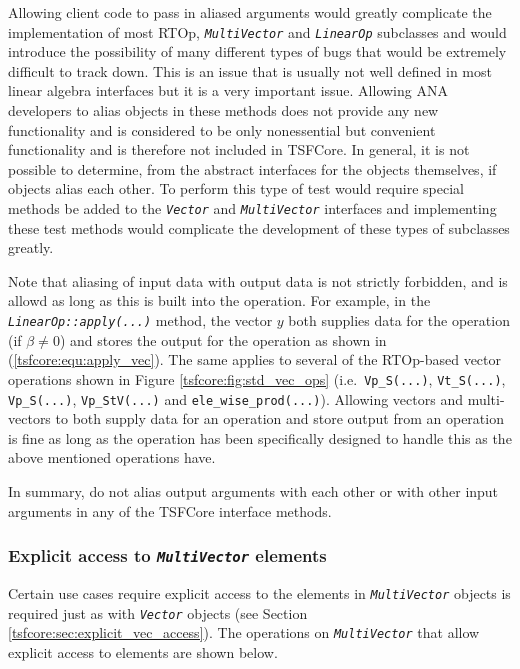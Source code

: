 {}\noindent{}Allowing client code to pass in aliased arguments would
greatly complicate the implementation of most RTOp,
{}\texttt{\textit{Multi\-Vector}} and {}\texttt{\textit{LinearOp}}
subclasses and would introduce the possibility of many different types
of bugs that would be extremely difficult to track down.  This is an
issue that is usually not well defined in most linear algebra
interfaces but it is a very important issue.  Allowing ANA developers
to alias objects in these methods does not provide any new
functionality and is considered to be only nonessential but convenient
functionality and is therefore not included in TSFCore.  In general,
it is not possible to determine, from the abstract interfaces for the
objects themselves, if objects alias each other.  To perform this type
of test would require special methods be added to the
{}\texttt{\textit{Vector}} and {}\texttt{\textit{Multi\-Vector}}
interfaces and implementing these test methods would complicate the
development of these types of subclasses greatly.

Note that aliasing of input data with output data is not strictly
forbidden, and is allowd as long as this is built into the operation.
For example, in the {}\texttt{\textit{LinearOp\-::apply(\-...)}}
method, the vector $y$ both supplies data for the operation (if $\beta
\ne 0$) and stores the output for the operation as shown in
(\ref{tsfcore:equ:apply_vec}).  The same applies to several of the
RTOp-based vector operations shown in Figure
{}\ref{tsfcore:fig:std_vec_ops} (i.e.~\texttt{Vp\_S(...)},
{}\texttt{Vt\_S(...)}, {}\texttt{Vp\_S(...)}, {}\texttt{Vp\_StV(...)}
and {}\texttt{ele\_wise\_prod(...)}).  Allowing vectors and
multi-vectors to both supply data for an operation and store output
from an operation is fine as long as the operation has been
specifically designed to handle this as the above mentioned operations
have.

In summary, do not alias output arguments with each other or with
other input arguments in any of the TSFCore interface methods.

%
\subsubsection{Explicit access to {}\texttt{\textit{Multi\-Vector}} elements}
\label{tsfcore:sec:explicit_multi_vec_access}
%

Certain use cases require explicit access to the elements in
{}\texttt{\textit{Multi\-Vector}} objects is required just as with
{}\texttt{\textit{Vector}} objects (see Section
{}\ref{tsfcore:sec:explicit_vec_access}).  The operations on
{}\texttt{\textit{Multi\-Vector}} that allow explicit access to
elements are shown below.

